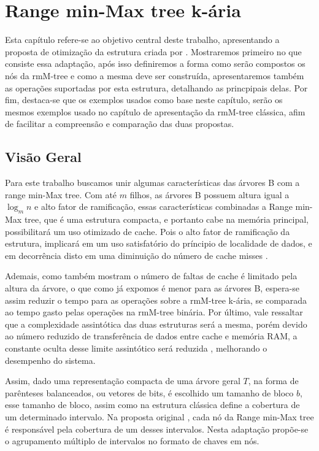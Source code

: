\chapter{Range min-Max tree k-ária}
\label{chp:desenvolvimento}
Esta capítulo refere-se ao objetivo central deste trabalho, apresentando a proposta de otimização da estrutura criada por \cite{paper-fully-functinal-succint-trees}.
Mostraremos primeiro no que consiste essa adaptação, após isso definiremos a forma como serão compostos os nós da rmM-tree e como a mesma deve ser construída,
apresentaremos também as operações suportadas por esta estrutura, detalhando as princpipais delas. 
Por fim, destaca-se que os exemplos usados como base neste capítulo, 
serão os mesmos exemplos usado no capítulo de apresentação da rmM-tree clássica, afim de facilitar a compreensão e comparação das duas propostas.

\section{Visão Geral}
Para este trabalho buscamos unir algumas características das árvores B com a range min-Max tree. 
Com até $m$ filhos, as árvores B possuem altura igual a $\log_m n$ e alto fator de ramificação, essas características combinadas a Range min-Max tree,
que é uma estrutura compacta, e portanto cabe na memória principal, possibilitará um uso otimizado de cache. Pois o alto fator de ramificação da estrutura,
implicará em um uso satisfatório do príncipio de localidade de dados, e em decorrência disto em uma diminuição do número de cache misses 
\citep{paper-making-btree-cache}.

Ademais, como também mostram \citet{paper-effect-node-size-cache-b-trees} o número de faltas de cache é limitado pela altura da árvore,
o que como já expomos é menor para as árvores B, espera-se assim reduzir o tempo para as operações sobre a rmM-tree k-ária, se comparada ao
tempo gasto pelas operações na rmM-tree binária.
Por último, vale ressaltar que a complexidade assintótica das duas estruturas será a mesma, 
porém devido ao número reduzido de transferência de dados entre cache e memória RAM, 
a constante oculta desse limite assintótico será reduzida \citep{book-algoritmos-teoria-pratica}, melhorando o desempenho do sistema.

Assim, dado uma representação compacta de uma árvore geral $T$, na forma de parênteses balanceados, ou vetores de bits, 
é escolhido um tamanho de bloco $b$, esse tamanho de bloco, assim como na estrutura clássica define a cobertura de um determinado 
intervalo. 
Na proposta original \citep{paper-fully-functinal-succint-trees}, cada nó da Range min-Max tree é responsável pela cobertura de um desses intervalos. 
Nesta adaptação propõe-se o agrupamento múltiplo de intervalos no formato de chaves em nós.

